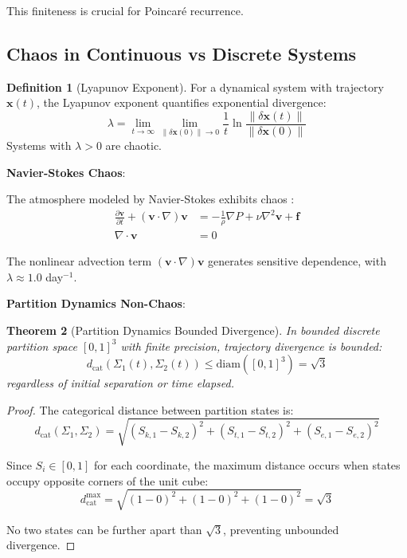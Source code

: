\documentclass[twocolumn,10pt,a4paper]{article}
\newtheorem{theorem}{Theorem}[section]
\theoremstyle{definition}
\newtheorem{definition}[theorem]{Definition}
\theoremstyle{remark}
\begin{document}
This finiteness is crucial for Poincaré recurrence.

\subsection{Chaos in Continuous vs Discrete Systems}

\begin{definition}[Lyapunov Exponent]
\label{def:lyapunov}
For a dynamical system with trajectory $\mathbf{x}(t)$, the Lyapunov exponent quantifies exponential divergence:
\begin{equation}
    \lambda = \lim_{t\to\infty} \lim_{\|\delta\mathbf{x}(0)\|\to 0} \frac{1}{t} \ln\frac{\|\delta\mathbf{x}(t)\|}{\|\delta\mathbf{x}(0)\|}
\end{equation}
Systems with $\lambda > 0$ are chaotic.
\end{definition}

\textbf{Navier-Stokes Chaos}:

The atmosphere modeled by Navier-Stokes exhibits chaos \cite{lorenz1963deterministic}:
\begin{align}
    \frac{\partial \mathbf{v}}{\partial t} + (\mathbf{v} \cdot \nabla)\mathbf{v} &= -\frac{1}{\rho}\nabla P + \nu \nabla^2 \mathbf{v} + \mathbf{f} \\
    \nabla \cdot \mathbf{v} &= 0
\end{align}

The nonlinear advection term $(\mathbf{v} \cdot \nabla)\mathbf{v}$ generates sensitive dependence, with $\lambda \approx 1.0$ day$^{-1}$.

\textbf{Partition Dynamics Non-Chaos}:

\begin{theorem}[Partition Dynamics Bounded Divergence]
\label{thm:bounded_divergence}
In bounded discrete partition space $[0,1]^3$ with finite precision, trajectory divergence is bounded:
\begin{equation}
    d_{\text{cat}}(\Sigma_1(t), \Sigma_2(t)) \leq \text{diam}([0,1]^3) = \sqrt{3}
\end{equation}
regardless of initial separation or time elapsed.
\end{theorem}

\begin{proof}
The categorical distance between partition states is:
\begin{equation}
    d_{\text{cat}}(\Sigma_1, \Sigma_2) = \sqrt{(S_{k,1} - S_{k,2})^2 + (S_{t,1} - S_{t,2})^2 + (S_{e,1} - S_{e,2})^2}
\end{equation}

Since $S_i \in [0,1]$ for each coordinate, the maximum distance occurs when states occupy opposite corners of the unit cube:
\begin{equation}
    d_{\text{cat}}^{\max} = \sqrt{(1-0)^2 + (1-0)^2 + (1-0)^2} = \sqrt{3}
\end{equation}

No two states can be further apart than $\sqrt{3}$, preventing unbounded divergence.
\end{proof}
\end{document}

